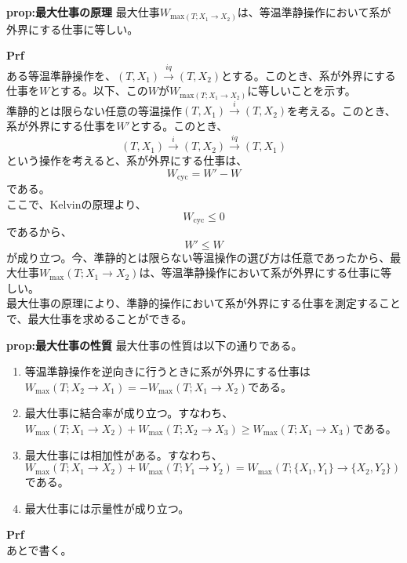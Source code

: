 \documentclass[a4paper,11pt]{jsarticle}
\begin{document}
\begin{itembox}[l]{\textbf{prop:最大仕事の原理}}
    最大仕事$W_{\text{max}(T;X_1\rightarrow X_2)}$は、等温準静操作において系が外界にする仕事に等しい。
\end{itembox}
\textbf{Prf}\\
ある等温準静操作を、$(T,X_1) \xrightarrow{iq} (T,X_2)$とする。このとき、系が外界にする仕事を$W$とする。以下、この$W$が$W_{\text{max}(T;X_1\rightarrow X_2)}$に等しいことを示す。\\
準静的とは限らない任意の等温操作$(T,X_1) \xrightarrow{i} (T,X_2)$を考える。このとき、系が外界にする仕事を$W'$とする。このとき、
\begin{equation}
    (T,X_1) \xrightarrow{i} (T,X_2) \xrightarrow{iq} (T,X_1)
\end{equation}
という操作を考えると、系が外界にする仕事は、
\begin{equation}
    W_{\text{cyc}} = W'-W
\end{equation}
である。\\
ここで、Kelvinの原理より、
\begin{equation}
    W_{\text{cyc}} \leq 0
\end{equation}
であるから、
\begin{equation}
    W' \leq W
\end{equation}
が成り立つ。今、準静的とは限らない等温操作の選び方は任意であったから、最大仕事$W_{\text{max}}(T;X_1\rightarrow X_2)$は、等温準静操作において系が外界にする仕事に等しい。\\

最大仕事の原理により、準静的操作において系が外界にする仕事を測定することで、最大仕事を求めることができる。\\

\begin{itembox}[l]{\textbf{prop:最大仕事の性質}}
    最大仕事の性質は以下の通りである。
    \begin{enumerate}
        \item 等温準静操作を逆向きに行うときに系が外界にする仕事は$W_{\text{max}}(T;X_2\rightarrow X_1)=-W_{\text{max}}(T;X_1\rightarrow X_2)$である。
        \item 最大仕事に結合率が成り立つ。すなわち、$W_{\text{max}}(T;X_1\rightarrow X_2)+W_{\text{max}}(T;X_2\rightarrow X_3) \geq W_{\text{max}}(T;X_1\rightarrow X_3)$である。
        \item 最大仕事には相加性がある。すなわち、$W_{\text{max}}(T;X_1\rightarrow X_2)+W_{\text{max}}(T;Y_1\rightarrow Y_2) = W_{\text{max}}(T;\{X_1,Y_1\}\rightarrow \{X_2,Y_2\})$である。
        \item 最大仕事には示量性が成り立つ。
    \end{enumerate}
\end{itembox}
\textbf{Prf}\\
あとで書く。\\
\end{document}
